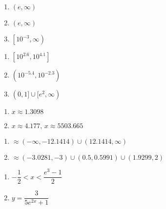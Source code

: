 \begin{multicols}{3}
\begin{enumerate}
\setcounter{enumi}{\value{HW}}

\item $(e, \infty)$
\item $(e, \infty)$
\item $\left[10^{-3}, \infty \right)$

\setcounter{HW}{\value{enumi}}
\end{enumerate}
\end{multicols}

\begin{multicols}{3}
\begin{enumerate}
\setcounter{enumi}{\value{HW}}

\item $\left[10^{2.6}, 10^{4.1}\right]$

\item $\left(10^{-5.4}, 10^{-2.3}\right)$
\item $(0, 1] \cup [e^{2}, \infty)$

\setcounter{HW}{\value{enumi}}
\end{enumerate}
\end{multicols}

\begin{multicols}{2}
\begin{enumerate}
\setcounter{enumi}{\value{HW}}

\item $x \approx 1.3098$
\item $x \approx 4.177, \, x \approx 5503.665$

\setcounter{HW}{\value{enumi}}
\end{enumerate}
\end{multicols}

\begin{multicols}{2}
\begin{enumerate}
\setcounter{enumi}{\value{HW}}

\item $\approx (-\infty, -12.1414) \cup (12.1414, \infty)$
\item $\approx (-3.0281, -3) \cup (0.5, 0.5991) \cup (1.9299, 2)$

\setcounter{HW}{\value{enumi}}
\end{enumerate}
\end{multicols}

\begin{multicols}{2}
\begin{enumerate}
\setcounter{enumi}{\value{HW}}

\item $-\dfrac{1}{2} < x < \dfrac{e^{3} - 1}{2}$

\item $y = \dfrac{3}{5e^{2x} + 1}$ 

\setcounter{HW}{\value{enumi}}
\end{enumerate}
\end{multicols}

